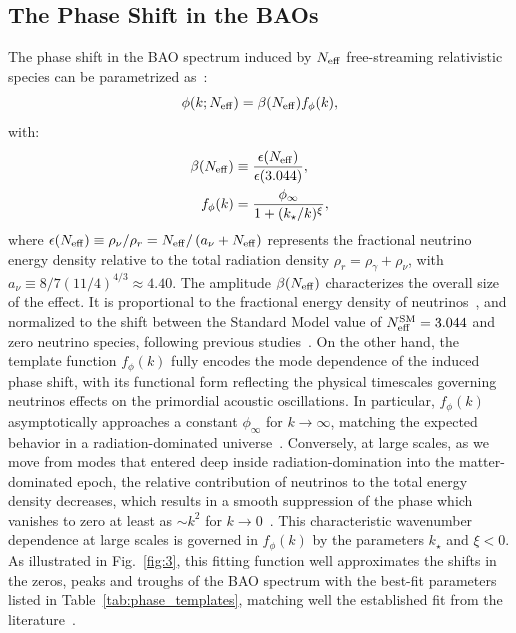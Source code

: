 \documentclass[floats,floatfix,showpacs,amssymb,prd,twocolumn,superscriptaddress,nofootinbib,reprint,preprintnumbers]{revtex4-2}
\begin{document}
\subsection{The Phase Shift in the BAOs}
\noindent The phase shift in the BAO spectrum induced by $N_{\rm eff}$ free-streaming relativistic species can be parametrized as~\cite{Baumann:2017gkg,Baumann:2019keh,Green:2020fjb}:
\begin{equation}
    \phi(k; N_{\rm eff})= \beta(N_{\rm eff})f_\phi(k), \label{eq:dphi}
\end{equation}
with:
\begin{align}
    \beta(N_{\rm eff})&\equiv \frac{\epsilon(N_{\rm eff})}{\epsilon(3.044)},\label{eq:beta} \\
    f_\phi(k)&=\frac{\phi_{\infty}}{1+(k_\star/k)^\xi},\label{eq:fphi}
\end{align}
 where $\epsilon(N_{\rm eff})\equiv \rho_\nu/\rho_r=N_{\rm eff}/\left(a_\nu +N_{\rm eff}\right)$ represents the fractional neutrino energy density relative to the total radiation density $\rho_r=\rho_\gamma+\rho_\nu$, with $a_\nu\equiv 8/7\left(11/4\right)^{4/3}\approx 4.40$. The amplitude $\beta(N_{\rm eff})$ characterizes the overall size of the effect. It is proportional to the fractional energy density of neutrinos~\cite{Bashinsky:2003tk, Baumann:2015rya}, and  normalized to the shift between the Standard Model value of $N_{\rm eff}^{\rm SM}=3.044$ and zero neutrino species, following previous studies~\cite{Baumann:2017gkg,Baumann:2019keh}.
 On the other hand, the template function $f_\phi(k)$ fully encodes the mode dependence of the induced phase shift, with its functional form reflecting the physical timescales governing neutrinos effects on the primordial acoustic oscillations. In particular, $f_\phi(k)$ asymptotically approaches a constant $\phi_\infty$ for $k\rightarrow\infty$, matching the expected behavior in a radiation-dominated universe~\cite{Bashinsky:2003tk,Baumann:2015rya}.  Conversely, at large scales, as we move  from modes that entered deep inside radiation-domination into the matter-dominated epoch, the relative contribution of neutrinos to the total energy density decreases, which results in a smooth suppression of the phase which vanishes to zero at least as $\sim k^2$ for $k \to 0$~\cite{Baumann:2015rya}. This characteristic wavenumber dependence at large scales is governed in $f_\phi(k)$ by the parameters $k_\star$ and $\xi<0$. As
illustrated in Fig.~\ref{fig:3}, this fitting function well approximates the shifts in the zeros, peaks and troughs of the BAO spectrum with the best-fit parameters listed in Table~\ref{tab:phase_templates}, matching well the established fit from the literature~\cite{Baumann:2017gkg}. 
\end{document}
